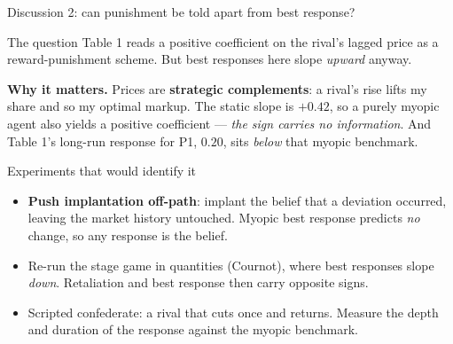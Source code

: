 \documentclass[aspectratio=169,9pt]{beamer}
\newcommand{\orange}[1]{\textcolor{AmazonOrange}{\textbf{#1}}}
\begin{document}
\begin{frame}{Discussion 2: can punishment be told apart from best response?}
\begin{block}{The question}
Table 1 reads a positive coefficient on the rival's lagged price as a reward-punishment scheme. But best
responses here slope \textit{upward} anyway.
\end{block}
\pause
\vspace{0.1cm}
\textbf{Why it matters.} Prices are \orange{strategic complements}: a rival's rise lifts my share and so my
optimal markup. The static slope is $+0.42$, so a purely myopic agent also yields a positive coefficient ---
\textit{the sign carries no information}. And Table 1's long-run response for P1, $0.20$, sits \textit{below}
that myopic benchmark.
\pause
\vspace{0.1cm}
\begin{block}{Experiments that would identify it}
\begin{itemize}
    \item \orange{Push implantation off-path}: implant the belief that a deviation occurred, leaving the market
    history untouched. Myopic best response predicts \textit{no} change, so any response is the belief.
    \item Re-run the stage game in quantities (Cournot), where best responses slope \textit{down}. Retaliation
    and best response then carry opposite signs.
    \item Scripted confederate: a rival that cuts once and returns. Measure the depth and duration of the
    response against the myopic benchmark.
\end{itemize}
\end{block}
\end{frame}
\end{document}
